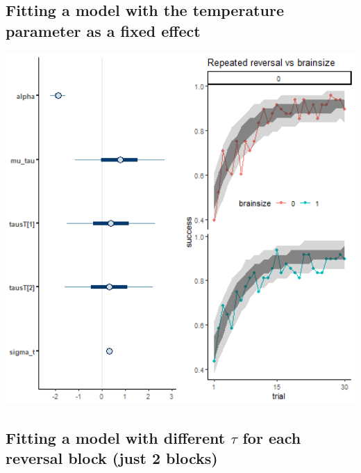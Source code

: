 \documentclass[
]{article}
\begin{document}
\hypertarget{fitting-a-model-with-the-temperature-parameter-as-a-fixed-effect}{%
\subsection{Fitting a model with the temperature parameter as a fixed
effect}\label{fitting-a-model-with-the-temperature-parameter-as-a-fixed-effect}}

\begin{flushleft}\includegraphics[width=6.67in,]{images/boussard_short_0_tau} \end{flushleft}

\hypertarget{fitting-a-model-with-different-tau-for-each-reversal-block-just-2-blocks}{%
\subsection{\texorpdfstring{Fitting a model with different \(\tau\) for
each reversal block (just 2
blocks)}{Fitting a model with different \textbackslash tau for each reversal block (just 2 blocks)}}\label{fitting-a-model-with-different-tau-for-each-reversal-block-just-2-blocks}}
\end{document}
